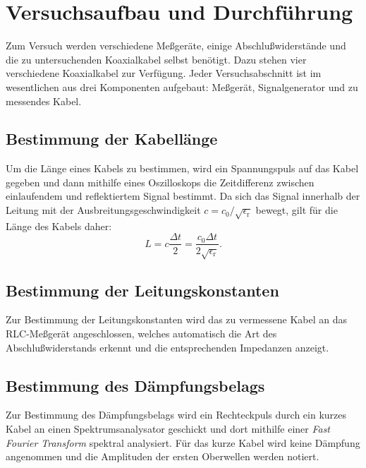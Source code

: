 
\section{Versuchsaufbau und Durchführung}

Zum Versuch werden verschiedene Meßgeräte, einige Abschlußwiderstände
und die zu untersuchenden Koaxialkabel selbst benötigt.  Dazu stehen
vier verschiedene Koaxialkabel zur Verfügung.  Jeder Versuchsabschnitt
ist im wesentlichen aus drei Komponenten aufgebaut: Meßgerät,
Signalgenerator und zu messendes Kabel.

\subsection{Bestimmung der Kabellänge}

Um die Länge eines Kabels zu bestimmen, wird ein Spannungspuls auf das
Kabel gegeben und dann mithilfe eines Oszilloskops die Zeitdifferenz
zwischen einlaufendem und reflektiertem Signal bestimmt.  Da sich das
Signal innerhalb der Leitung mit der Ausbreitungsgeschwindigkeit $c =
c_0/\sqrt{\epsilon_\text{r}}$ bewegt, gilt für die Länge des Kabels
daher:
% 
\begin{equation}
  \label{eq:laenge}
  L = c \frac{\Delta t}{2} = \frac{c_0 \Delta t}{2 \sqrt{\epsilon_\text{r}}}.
\end{equation}

\subsection{Bestimmung der Leitungskonstanten}

Zur Bestimmung der Leitungskonstanten wird das zu vermessene Kabel an
das RLC-Meßgerät angeschlossen, welches automatisch die Art des
Abschlußwiderstands erkennt und die entsprechenden Impedanzen anzeigt.

\subsection{Bestimmung des Dämpfungsbelags}

Zur Bestimmung des Dämpfungsbelags wird ein Rechteckpuls durch ein
kurzes Kabel an einen Spektrumsanalysator geschickt und dort mithilfe
einer \textit{Fast Fourier Transform} spektral analysiert.  Für das
kurze Kabel wird keine Dämpfung angenommen und die Amplituden der ersten
Oberwellen werden notiert.

